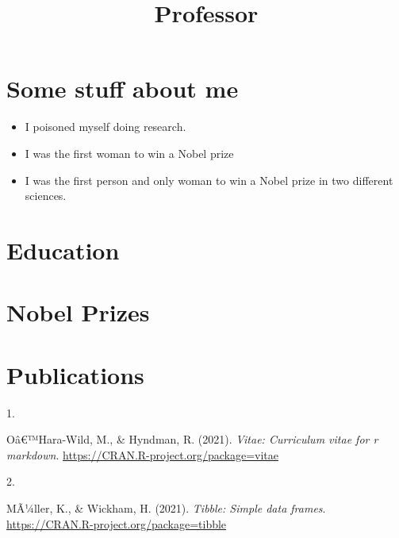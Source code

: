 \documentclass[11pt,a4paper,]{moderncv}
\title{Professor}
\providecommand{\tightlist}{%
	\setlength{\itemsep}{0pt}\setlength{\parskip}{0pt}}
\newlength{\csllabelwidth}
\newcommand{\CSLLeftMargin}[1]{\parbox[t]{\csllabelwidth}{#1}}
\newcommand{\CSLRightInline}[1]{\parbox[t]{\linewidth - \csllabelwidth}{#1}}
\begin{document}
\makecvtitle



\hypertarget{some-stuff-about-me}{%
\section{Some stuff about me}\label{some-stuff-about-me}}

\begin{itemize}
\tightlist
\item
  I poisoned myself doing research.
\item
  I was the first woman to win a Nobel prize
\item
  I was the first person and only woman to win a Nobel prize in two
  different sciences.
\end{itemize}

\hypertarget{education}{%
\section{Education}\label{education}}

\nopagebreak

\hypertarget{nobel-prizes}{%
\section{Nobel Prizes}\label{nobel-prizes}}

\nopagebreak

\hypertarget{publications}{%
\section{Publications}\label{publications}}

\hypertarget{bibliography}{}
\leavevmode\hypertarget{ref-R-vitae}{}%
\CSLLeftMargin{1. }
\CSLRightInline{Oâ€™Hara-Wild, M., \& Hyndman, R. (2021). \emph{Vitae:
Curriculum vitae for r markdown}.
\url{https://CRAN.R-project.org/package=vitae}}

\leavevmode\hypertarget{ref-R-tibble}{}%
\CSLLeftMargin{2. }
\CSLRightInline{MÃ¼ller, K., \& Wickham, H. (2021). \emph{Tibble: Simple
data frames}. \url{https://CRAN.R-project.org/package=tibble}}
\end{document}

